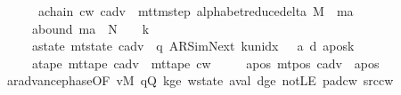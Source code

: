 \begin{isabellebody}
\ \ \ \ \ \ a{\isacharunderscore}{\kern0pt}chain{\isacharcolon}{\kern0pt}\ {\isachardoublequoteopen}{\isacharparenleft}{\kern0pt}c{\isacharunderscore}{\kern0pt}w{\isacharcomma}{\kern0pt}\ c{\isacharunderscore}{\kern0pt}adv{\isacharparenright}{\kern0pt}\ {\isasymin}\ {\isacharparenleft}{\kern0pt}mttm{\isacharunderscore}{\kern0pt}step\ {\isacharparenleft}{\kern0pt}alphabet{\isacharunderscore}{\kern0pt}reduce{\isacharunderscore}{\kern0pt}delta\ M{\isacharparenright}{\kern0pt}{\isacharparenright}{\kern0pt}\ {\isacharcircum}{\kern0pt}{\isacharcircum}{\kern0pt}\ m{\isacharunderscore}{\kern0pt}a{\isachardoublequoteclose}\isanewline
\ \ \ \ \ a{\isacharunderscore}{\kern0pt}bound{\isacharcolon}{\kern0pt}\ {\isachardoublequoteopen}m{\isacharunderscore}{\kern0pt}a\ {\isasymle}\ {\isacharquery}{\kern0pt}N\ {\isacharasterisk}{\kern0pt}\ {\isacharparenleft}{\kern0pt}{}\ {\isacharasterisk}{\kern0pt}\ {\isacharquery}{\kern0pt}k{\isacharparenright}{\kern0pt}{\isachardoublequoteclose}\isanewline
\ \ \ \ \ a{\isacharunderscore}{\kern0pt}state{\isacharcolon}{\kern0pt}\ {\isachardoublequoteopen}mt{\isacharunderscore}{\kern0pt}state\ c{\isacharunderscore}{\kern0pt}adv\ {\isacharequal}{\kern0pt}\ {\isacharparenleft}{\kern0pt}q{\isacharprime}{\kern0pt}{\isacharcomma}{\kern0pt}\ AR{\isacharunderscore}{\kern0pt}SimNext{\isacharcomma}{\kern0pt}\ k{\isacharunderscore}{\kern0pt}unidx\ {}{\isacharcomma}{\kern0pt}\ {}{\isacharcomma}{\kern0pt}\ a{\isacharprime}{\kern0pt}{\isacharcomma}{\kern0pt}\ d{\isacharcomma}{\kern0pt}\ {\isacharquery}{\kern0pt}aposk{\isacharparenright}{\kern0pt}{\isachardoublequoteclose}\isanewline
\ \ \ \ \ a{\isacharunderscore}{\kern0pt}tape{\isacharcolon}{\kern0pt}\ {\isachardoublequoteopen}mt{\isacharunderscore}{\kern0pt}tape\ c{\isacharunderscore}{\kern0pt}adv\ {\isacharequal}{\kern0pt}\ mt{\isacharunderscore}{\kern0pt}tape\ c{\isacharunderscore}{\kern0pt}w{\isachardoublequoteclose}\isanewline
\ \ \ \ \ a{\isacharunderscore}{\kern0pt}pos{\isacharcolon}{\kern0pt}\ {\isachardoublequoteopen}mt{\isacharunderscore}{\kern0pt}pos\ c{\isacharunderscore}{\kern0pt}adv\ {\isacharequal}{\kern0pt}\ {\isacharquery}{\kern0pt}apos{\isachardoublequoteclose}\isanewline
\ \ \ \ \isamarkupfalse%
\ ar{\isacharunderscore}{\kern0pt}advance{\isacharunderscore}{\kern0pt}phase{\isacharbrackleft}{\kern0pt}OF\ vM\ q{\isacharprime}{\kern0pt}Q\ kge{}\ w{\isacharunderscore}{\kern0pt}state{\isacharprime}{\kern0pt}\ a{\isacharprime}{\kern0pt}val\ dge{}\ notLE\ pad{\isacharunderscore}{\kern0pt}cw\ src{\isacharunderscore}{\kern0pt}cw{\isacharbrackright}{\kern0pt}\isanewline

\end{isabellebody}
